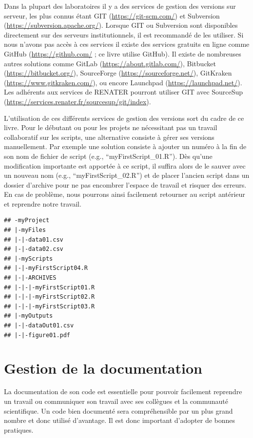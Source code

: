 \documentclass[
]{book}
\begin{document}
Dans la plupart des laboratoires il y a des services de gestion des versions sur serveur, les plus connus étant GIT (\url{https://git-scm.com/}) et Subversion (\url{https://subversion.apache.org/}). Lorsque GIT ou Subversion sont disponibles directement sur des serveurs institutionnels, il est recommandé de les utiliser. Si nous n'avons pas accès à ces services il existe des services gratuits en ligne comme GitHub (\url{https://github.com/} ; ce livre utilise GitHub). Il existe de nombreuses autres solutions comme GitLab (\url{https://about.gitlab.com/}), Bitbucket (\url{https://bitbucket.org/}), SourceForge (\url{https://sourceforge.net/}), GitKraken (\url{https://www.gitkraken.com/}), ou encore Launchpad (\url{https://launchpad.net/}). Les adhérents aux services de RENATER pourront utiliser GIT avec SourceSup (\url{https://services.renater.fr/sourcesup/git/index}).

L'utilisation de ces différents services de gestion des versions sort du cadre de ce livre. Pour le débutant ou pour les projets ne nécessitant pas un travail collaboratif sur les scripts, une alternative consiste à gérer ses versions manuellement. Par exemple une solution consiste à ajouter un numéro à la fin de son nom de fichier de script (e.g., ``myFirstScript\_01.R''). Dès qu'une modification importante est apportée à ce script, il suffira alors de le sauver avec un nouveau nom (e.g., ``myFirstScript\_02.R'') et de placer l'ancien script dans un dossier d'archive pour ne pas encombrer l'espace de travail et risquer des erreurs. En cas de problème, nous pourrons ainsi facilement retourner au script antérieur et reprendre notre travail.

\begin{verbatim}
## -myProject
## |-myFiles
## |-|-data01.csv
## |-|-data02.csv
## |-myScripts
## |-|-myFirstScript04.R
## |-|-ARCHIVES
## |-|-|-myFirstScript01.R
## |-|-|-myFirstScript02.R
## |-|-|-myFirstScript03.R
## |-myOutputs
## |-|-dataOut01.csv
## |-|-figure01.pdf
\end{verbatim}

\hypertarget{gestion-de-la-documentation}{%
\section{Gestion de la documentation}\label{gestion-de-la-documentation}}

La documentation de son code est essentielle pour pouvoir facilement reprendre un travail ou communiquer son travail avec ses collègues et la communauté scientifique. Un code bien documenté sera compréhensible par un plus grand nombre et donc utilisé d'avantage. Il est donc important d'adopter de bonnes pratiques.
\end{document}
